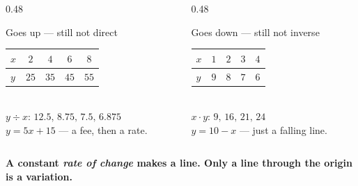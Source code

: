 \documentclass[aspectratio=169, 11pt]{beamer}
\begin{document}
\begin{frame}[t, plain]
  \begin{columns}[T]
    \begin{column}{0.48\textwidth}
      \begin{block}{Goes up --- still not direct}
        \centering
        \begin{tabular}{|l|c|c|c|c|}
        \hline
        $x$ & $2$ & $4$ & $6$ & $8$ \\ \hline
        $y$ & $25$ & $35$ & $45$ & $55$ \\ \hline
        \end{tabular}\\[4pt]
        $y\div x$: $12.5,\,8.75,\,7.5,\,6.875$ \\[2pt]
        $y=5x+15$ --- a fee, then a rate.
      \end{block}
    \end{column}
    \begin{column}{0.48\textwidth}
      \begin{block}{Goes down --- still not inverse}
        \centering
        \begin{tabular}{|l|c|c|c|c|}
        \hline
        $x$ & $1$ & $2$ & $3$ & $4$ \\ \hline
        $y$ & $9$ & $8$ & $7$ & $6$ \\ \hline
        \end{tabular}\\[4pt]
        $x\cdot y$: $9,\,16,\,21,\,24$ \\[2pt]
        $y=10-x$ --- just a falling line.
      \end{block}
    \end{column}
  \end{columns}
  \vspace{6pt}
  \begin{block}{}
    \centering\textbf{A constant \emph{rate of change} makes a line. Only a line through the origin is
    a variation.}
  \end{block}
\end{frame}
\end{document}
